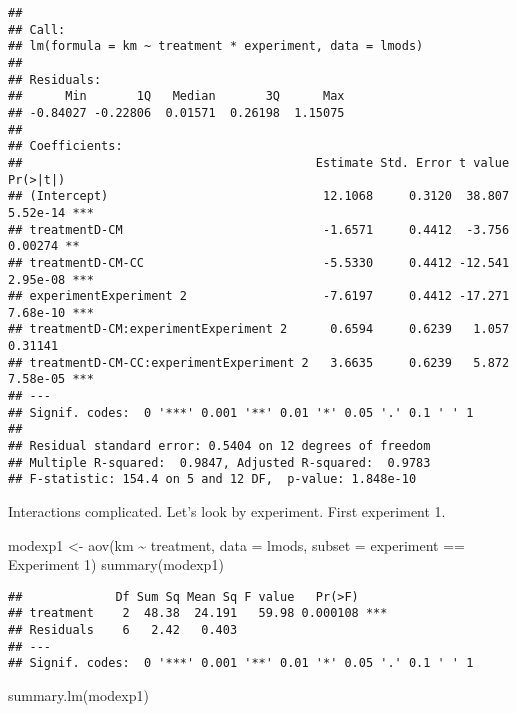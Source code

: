 \documentclass[
]{article}
\newenvironment{Shaded}{\begin{snugshade}}{\end{snugshade}}
\newcommand{\AttributeTok}[1]{\textcolor[rgb]{0.77,0.63,0.00}{#1}}
\newcommand{\FunctionTok}[1]{\textcolor[rgb]{0.00,0.00,0.00}{#1}}
\newcommand{\NormalTok}[1]{#1}
\newcommand{\OtherTok}[1]{\textcolor[rgb]{0.56,0.35,0.01}{#1}}
\newcommand{\SpecialCharTok}[1]{\textcolor[rgb]{0.00,0.00,0.00}{#1}}
\newcommand{\StringTok}[1]{\textcolor[rgb]{0.31,0.60,0.02}{#1}}
\begin{document}
\begin{verbatim}
## 
## Call:
## lm(formula = km ~ treatment * experiment, data = lmods)
## 
## Residuals:
##      Min       1Q   Median       3Q      Max 
## -0.84027 -0.22806  0.01571  0.26198  1.15075 
## 
## Coefficients:
##                                         Estimate Std. Error t value Pr(>|t|)    
## (Intercept)                              12.1068     0.3120  38.807 5.52e-14 ***
## treatmentD-CM                            -1.6571     0.4412  -3.756  0.00274 ** 
## treatmentD-CM-CC                         -5.5330     0.4412 -12.541 2.95e-08 ***
## experimentExperiment 2                   -7.6197     0.4412 -17.271 7.68e-10 ***
## treatmentD-CM:experimentExperiment 2      0.6594     0.6239   1.057  0.31141    
## treatmentD-CM-CC:experimentExperiment 2   3.6635     0.6239   5.872 7.58e-05 ***
## ---
## Signif. codes:  0 '***' 0.001 '**' 0.01 '*' 0.05 '.' 0.1 ' ' 1
## 
## Residual standard error: 0.5404 on 12 degrees of freedom
## Multiple R-squared:  0.9847, Adjusted R-squared:  0.9783 
## F-statistic: 154.4 on 5 and 12 DF,  p-value: 1.848e-10
\end{verbatim}

Interactions complicated. Let's look by experiment. First experiment 1.

\begin{Shaded}
\begin{Highlighting}[]
\NormalTok{modexp1 }\OtherTok{\textless{}{-}} \FunctionTok{aov}\NormalTok{(km }\SpecialCharTok{\textasciitilde{}}\NormalTok{ treatment, }\AttributeTok{data =}\NormalTok{ lmods, }\AttributeTok{subset =}\NormalTok{ experiment }\SpecialCharTok{==} \StringTok{\textquotesingle{}Experiment 1\textquotesingle{}}\NormalTok{)}
\FunctionTok{summary}\NormalTok{(modexp1)}
\end{Highlighting}
\end{Shaded}

\begin{verbatim}
##             Df Sum Sq Mean Sq F value   Pr(>F)    
## treatment    2  48.38  24.191   59.98 0.000108 ***
## Residuals    6   2.42   0.403                     
## ---
## Signif. codes:  0 '***' 0.001 '**' 0.01 '*' 0.05 '.' 0.1 ' ' 1
\end{verbatim}

\begin{Shaded}
\begin{Highlighting}[]
\FunctionTok{summary.lm}\NormalTok{(modexp1)}
\end{Highlighting}
\end{Shaded}
\end{document}
